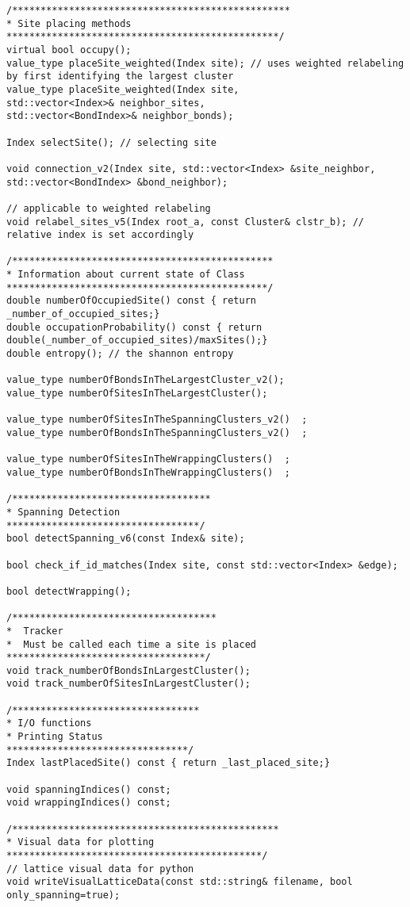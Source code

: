 \begin{lstlisting}[style=CStyle]
/*************************************************
* Site placing methods
************************************************/
virtual bool occupy();
value_type placeSite_weighted(Index site); // uses weighted relabeling by first identifying the largest cluster
value_type placeSite_weighted(Index site,
std::vector<Index>& neighbor_sites,
std::vector<BondIndex>& neighbor_bonds);

Index selectSite(); // selecting site

void connection_v2(Index site, std::vector<Index> &site_neighbor, std::vector<BondIndex> &bond_neighbor);

// applicable to weighted relabeling
void relabel_sites_v5(Index root_a, const Cluster& clstr_b); // relative index is set accordingly

/**********************************************
* Information about current state of Class
**********************************************/
double numberOfOccupiedSite() const { return _number_of_occupied_sites;}
double occupationProbability() const { return double(_number_of_occupied_sites)/maxSites();}
double entropy(); // the shannon entropy

value_type numberOfBondsInTheLargestCluster_v2();
value_type numberOfSitesInTheLargestCluster();

value_type numberOfSitesInTheSpanningClusters_v2()  ;
value_type numberOfBondsInTheSpanningClusters_v2()  ;

value_type numberOfSitesInTheWrappingClusters()  ;
value_type numberOfBondsInTheWrappingClusters()  ;

/***********************************
* Spanning Detection
**********************************/
bool detectSpanning_v6(const Index& site);

bool check_if_id_matches(Index site, const std::vector<Index> &edge);

bool detectWrapping();

/************************************
*  Tracker
*  Must be called each time a site is placed
***********************************/
void track_numberOfBondsInLargestCluster();
void track_numberOfSitesInLargestCluster();

/*********************************
* I/O functions
* Printing Status
********************************/
Index lastPlacedSite() const { return _last_placed_site;}

void spanningIndices() const;
void wrappingIndices() const;

/***********************************************
* Visual data for plotting
*********************************************/
// lattice visual data for python
void writeVisualLatticeData(const std::string& filename, bool only_spanning=true);


\end{lstlisting}
